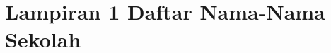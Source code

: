 \newpage
\thispagestyle{empty}

\section*{Lampiran 1 Daftar Nama-Nama Sekolah}
\label{lampiran1}








